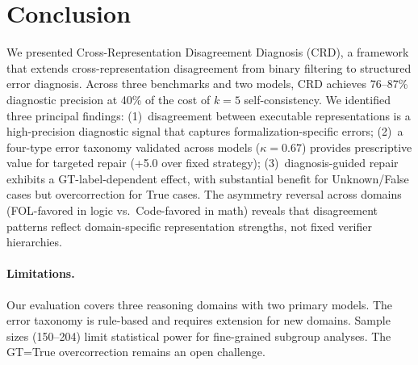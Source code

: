 \documentclass[11pt,a4paper]{article}
\newcommand{\pp}{\text{pp}}
\begin{document}
\section{Conclusion}

We presented Cross-Representation Disagreement Diagnosis (CRD), a framework that extends cross-representation disagreement from binary filtering to structured error diagnosis. Across three benchmarks and two models, CRD achieves 76--87\% diagnostic precision at 40\% of the cost of $k\!=\!5$ self-consistency. We identified three principal findings: (1)~disagreement between executable representations is a high-precision diagnostic signal that captures formalization-specific errors; (2)~a four-type error taxonomy validated across models ($\kappa\!=\!0.67$) provides prescriptive value for targeted repair (+5.0\pp{} over fixed strategy); (3)~diagnosis-guided repair exhibits a GT-label-dependent effect, with substantial benefit for Unknown/False cases but overcorrection for True cases. The asymmetry reversal across domains (FOL-favored in logic vs.\ Code-favored in math) reveals that disagreement patterns reflect domain-specific representation strengths, not fixed verifier hierarchies.

\paragraph{Limitations.}
Our evaluation covers three reasoning domains with two primary models. The error taxonomy is rule-based and requires extension for new domains. Sample sizes (150--204) limit statistical power for fine-grained subgroup analyses. The GT=True overcorrection remains an open challenge.
\end{document}
